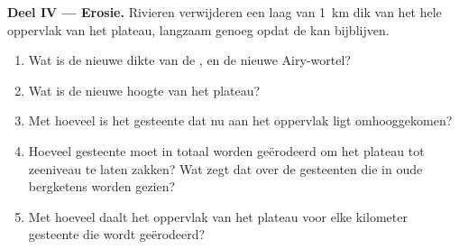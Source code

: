 \begin{problem}
\noindent\textbf{Deel IV --- Erosie.}
Rivieren verwijderen een laag van \qty{1}{km} dik van het hele oppervlak van het plateau, langzaam genoeg opdat de  kan bijblijven.
\begin{enumerate}[resume]
  \item Wat is de nieuwe dikte van de , en de nieuwe Airy-wortel?
  \item Wat is de nieuwe hoogte van het plateau?
  \item Met hoeveel is het gesteente dat nu aan het oppervlak ligt omhooggekomen?
  \item Hoeveel gesteente moet in totaal worden geërodeerd om het plateau tot zeeniveau te laten zakken? Wat zegt dat over de gesteenten die in oude bergketens worden gezien?
  \item Met hoeveel daalt het oppervlak van het plateau voor elke kilometer gesteente die wordt geërodeerd?
\end{enumerate}
\end{problem}

